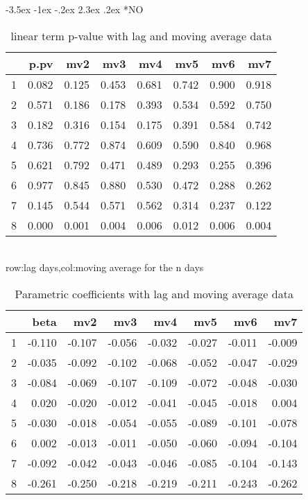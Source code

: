 \documentclass[a4paper, 12pt]{article}
\makeatletter
\def\large{\fontsize{14}{20}\selectfont}
\renewcommand\subsection{\@startsection {subsection}{1}{\z@}%
                                   {-3.5ex \@plus -1ex \@minus -.2ex}%
                                   {2.3ex \@plus.2ex}%
                                   {\centering\normalfont\large\bfseries}}
\makeatother
\begin{document}
\subsection*{NO}
\begin{table}[h]
\centering
\caption{linear term p-value with lag and moving average data}
\begin{tabular}{rrrrrrrr}
  \hline
 & p.pv & mv2 & mv3 & mv4 & mv5 & mv6 & mv7 \\
  \hline
1 & 0.082 & 0.125 & 0.453 & 0.681 & 0.742 & 0.900 & 0.918 \\
  2 & 0.571 & 0.186 & 0.178 & 0.393 & 0.534 & 0.592 & 0.750 \\
  3 & 0.182 & 0.316 & 0.154 & 0.175 & 0.391 & 0.584 & 0.742 \\
  4 & 0.736 & 0.772 & 0.874 & 0.609 & 0.590 & 0.840 & 0.968 \\
  5 & 0.621 & 0.792 & 0.471 & 0.489 & 0.293 & 0.255 & 0.396 \\
  6 & 0.977 & 0.845 & 0.880 & 0.530 & 0.472 & 0.288 & 0.262 \\
  7 & 0.145 & 0.544 & 0.571 & 0.562 & 0.314 & 0.237 & 0.122 \\
  8 & 0.000 & 0.001 & 0.004 & 0.006 & 0.012 & 0.006 & 0.004 \\
   \hline
\end{tabular}
\\row:lag days,col:moving average for the n days
\end{table}

\begin{table}[h]
\centering
\caption{Parametric coefficients with lag and moving average data}
\begin{tabular}{rrrrrrrr}
  \hline
 & beta & mv2 & mv3 & mv4 & mv5 & mv6 & mv7 \\
  \hline
1 & -0.110 & -0.107 & -0.056 & -0.032 & -0.027 & -0.011 & -0.009 \\
  2 & -0.035 & -0.092 & -0.102 & -0.068 & -0.052 & -0.047 & -0.029 \\
  3 & -0.084 & -0.069 & -0.107 & -0.109 & -0.072 & -0.048 & -0.030 \\
  4 & 0.020 & -0.020 & -0.012 & -0.041 & -0.045 & -0.018 & 0.004 \\
  5 & -0.030 & -0.018 & -0.054 & -0.055 & -0.089 & -0.101 & -0.078 \\
  6 & 0.002 & -0.013 & -0.011 & -0.050 & -0.060 & -0.094 & -0.104 \\
  7 & -0.092 & -0.042 & -0.043 & -0.046 & -0.085 & -0.104 & -0.143 \\
  8 & -0.261 & -0.250 & -0.218 & -0.219 & -0.211 & -0.243 & -0.262 \\
   \hline
\end{tabular}
\end{table}
\clearpage
\end{document}
